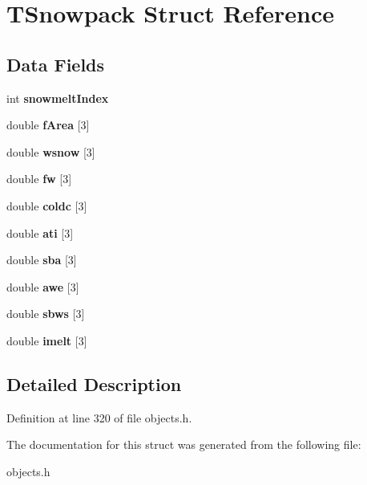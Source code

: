 \hypertarget{struct_t_snowpack}{}\section{T\+Snowpack Struct Reference}
\label{struct_t_snowpack}
\subsection*{Data Fields}
\begin{DoxyCompactItemize}
\item 
\mbox{\label{struct_t_snowpack_a0675d630344ddf27dddbefa834d69f4c}} 
int {\bfseries snowmelt\+Index}
\item 
\mbox{\label{struct_t_snowpack_a0fcbaa11557324612b4567c754ce7757}} 
double {\bfseries f\+Area} \mbox{[}3\mbox{]}
\item 
\mbox{\label{struct_t_snowpack_ae8c1afb272e19014de0866e6048b70c3}} 
double {\bfseries wsnow} \mbox{[}3\mbox{]}
\item 
\mbox{\label{struct_t_snowpack_abf71b346364d48cb6a027d4d91095a41}} 
double {\bfseries fw} \mbox{[}3\mbox{]}
\item 
\mbox{\label{struct_t_snowpack_a619d4420c352a85fa4d617bb5e9b36b9}} 
double {\bfseries coldc} \mbox{[}3\mbox{]}
\item 
\mbox{\label{struct_t_snowpack_adc01af567392be7041ec9c34f4111219}} 
double {\bfseries ati} \mbox{[}3\mbox{]}
\item 
\mbox{\label{struct_t_snowpack_a9b6bc6cc6209dddebc09c33dee419b58}} 
double {\bfseries sba} \mbox{[}3\mbox{]}
\item 
\mbox{\label{struct_t_snowpack_a1406f9271b1416baff48cc9f55bec338}} 
double {\bfseries awe} \mbox{[}3\mbox{]}
\item 
\mbox{\label{struct_t_snowpack_ab385be773a082bd65b6f81cf29060dfb}} 
double {\bfseries sbws} \mbox{[}3\mbox{]}
\item 
\mbox{\label{struct_t_snowpack_aa556cf7aae233704aec32e6373f3c3ad}} 
double {\bfseries imelt} \mbox{[}3\mbox{]}
\end{DoxyCompactItemize}


\subsection{Detailed Description}


Definition at line 320 of file objects.\+h.



The documentation for this struct was generated from the following file\+:\begin{DoxyCompactItemize}
\item 
objects.\+h\end{DoxyCompactItemize}
